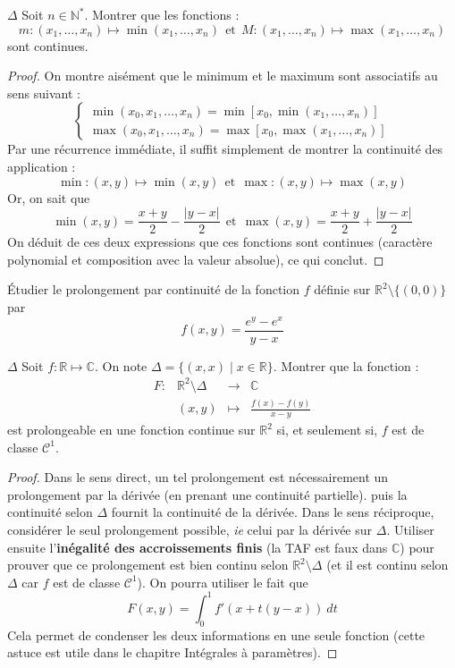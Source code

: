 \documentclass[french,a4paper]{article}
\newcommand{\N}{\mathbb{N}}
\newcommand{\R}{\mathbb{R}}
\newcommand{\C}{\mathbb{C}}
\newcommand{\st}{^*}
\theoremstyle{plain}
\theoremstyle{definition}
\theoremstyle{remark}
\begin{document}
\begin{ex}{$\Delta$}
	Soit $n\in\N\st$. Montrer que les fonctions : $$m:(x_1,\ldots,x_n)\mapsto\min(x_1,\ldots,x_n)\ \ \text{et}\ \ M:(x_1,\ldots,x_n)\mapsto\max(x_1,\ldots,x_n)$$ sont continues.
\end{ex}
\begin{proof}
	On montre aisément que le minimum et le maximum sont associatifs au sens suivant : $$\begin{cases}
		\min(x_0,x_1,\ldots,x_n)=\min\left[x_0,\min(x_1,\ldots,x_n)\right] \\
		\max(x_0,x_1,\ldots,x_n)=\max\left[x_0,\max(x_1,\ldots,x_n)\right]
	\end{cases}$$ Par une récurrence immédiate, il suffit simplement de montrer la continuité des application : $$\min:(x,y)\mapsto\min(x,y) \ \ \text{et} \ \ \max:(x,y)\mapsto\max(x,y)$$ Or, on sait que $$\min(x,y)=\frac{x+y}{2}-\frac{\lvert y-x\rvert}{2} \ \ \text{et} \ \ \max(x,y)=\frac{x+y}{2}+\frac{\lvert y-x\rvert}{2}$$ On déduit de ces deux expressions que ces fonctions sont continues (caractère polynomial et composition avec la valeur absolue), ce qui conclut.
\end{proof}

\begin{ex}{}
	Étudier le prolongement par continuité de la fonction $f$ définie sur $\R^2\setminus\{(0,0)\}$ par $$f(x,y)=\frac{e^y-e^x}{y-x}$$
\end{ex}

\begin{ex}{$\Delta$}
	Soit $f:\R\mapsto\C$. On note $\Delta=\{(x,x)\mid x\in\R\}$. Montrer que la fonction : $$\begin{array}{lrcl}
		F:&\R^2\setminus\Delta&\longrightarrow&\C\\
		&(x,y)&\longmapsto&\displaystyle\frac{f(x)-f(y)}{x-y}
	\end{array}$$ est prolongeable en une fonction continue sur $\R^2$ si, et seulement si, $f$ est de classe $\mathcal{C}^1$.
\end{ex}
\begin{proof}
	Dans le sens direct, un tel prolongement est nécessairement un prolongement par la dérivée (en prenant une continuité partielle). puis la continuité selon $\Delta$ fournit la continuité de la dérivée. Dans le sens réciproque, considérer le seul prolongement possible, \textit{ie} celui par la dérivée sur $\Delta$. Utiliser ensuite l'\textbf{inégalité des accroissements finis} (la TAF est faux dans $\C$) pour prouver que ce prolongement est bien continu selon $\R^2\setminus\Delta$ (et il est continu selon $\Delta$ car $f$ est de classe $\mathcal{C}^1$). On pourra utiliser le fait que $$F(x,y)=\int_{0}^{1}f'(x+t(y-x))\ dt$$ Cela permet de condenser les deux informations en une seule fonction (cette astuce est utile dans le chapitre Intégrales à paramètres).
\end{proof}
\end{document}
